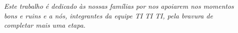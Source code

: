 \begin{dedicatoria}
   \vspace*{\fill}
   \centering
   \noindent
   \textit{ Este trabalho é dedicado às nossas famílias por nos apoiarem nos momentos\\ bons e ruins e a nós, integrantes da equipe TI TI TI, pela bravura de \\
   completar mais uma etapa.} 
   
   \vspace*{\fill}
   

\end{dedicatoria}
